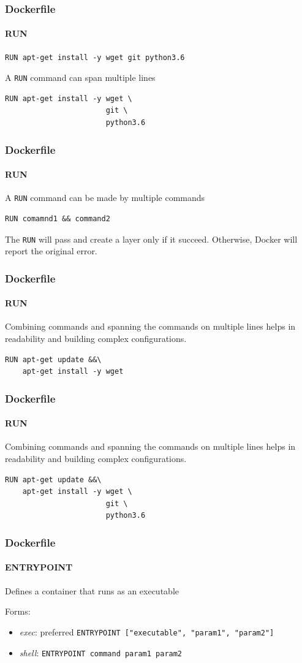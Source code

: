 \begin{frame}[fragile]
\frametitle{Dockerfile}
\framesubtitle{RUN}

\begin{lstlisting}
RUN apt-get install -y wget git python3.6
\end{lstlisting}

A \lstinline!RUN! command can span multiple lines


\begin{lstlisting}
RUN apt-get install -y wget \
                       git \
					   python3.6
\end{lstlisting}
\end{frame}

\begin{frame}[fragile]
\frametitle{Dockerfile}
\framesubtitle{RUN}

A \lstinline!RUN! command can be made by multiple commands

\begin{lstlisting}
RUN comamnd1 && command2
\end{lstlisting}

The \lstinline!RUN! will pass and create a layer only if it succeed. Otherwise, Docker will report the original error.
\end{frame}

\begin{frame}[fragile]
\frametitle{Dockerfile}
\framesubtitle{RUN}

Combining commands and spanning the commands on multiple lines helps in readability and building complex configurations.

\begin{lstlisting}
RUN apt-get update &&\
    apt-get install -y wget 
\end{lstlisting}
\end{frame}

\begin{frame}[fragile]
\frametitle{Dockerfile}
\framesubtitle{RUN}

Combining commands and spanning the commands on multiple lines helps in readability and building complex configurations.

\begin{lstlisting}
RUN apt-get update &&\
    apt-get install -y wget \
	                   git \
					   python3.6
\end{lstlisting}
\end{frame}

\begin{frame}[fragile]
\frametitle{Dockerfile}
\framesubtitle{ENTRYPOINT}
Defines a container that runs as an executable

Forms:

\begin{itemize}
\item \textit{exec}: preferred \lstinline!ENTRYPOINT ["executable", "param1", "param2"]!

\item \textit{shell}:  \lstinline!ENTRYPOINT command param1 param2!
\end{itemize}
\end{frame}


